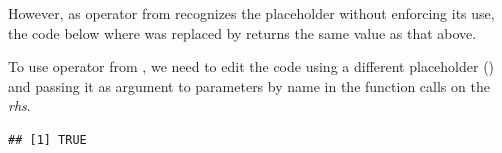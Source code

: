 \documentclass[krantz2]{krantz}\usepackage{knitr}
\begin{document}
However, as operator \Roperator{\%>\%} from  recognizes the  placeholder without enforcing its use, the code below where  was replaced by \Roperator{\%>\%} returns the same value as that above.

\begin{knitrout}\footnotesize
{}\color{fgcolor}
\end{knitrout}

To use operator \Roperator{|>} from \Rlang, we need to edit the code using a different placeholder (\code{\_}) and passing it as argument to parameters by name in the function calls on the \textit{rhs}.

\begin{knitrout}\footnotesize
{}\color{fgcolor}\begin{kframe}
\begin{alltt}
 \hlstd{(} \hlstd{= _) |>} \hlstd{(} \hlstd{= _)} \hlkwb{->} 
\end{alltt}
\begin{verbatim}
## [1] TRUE
\end{verbatim}
\end{kframe}
\end{knitrout}
\end{document}
